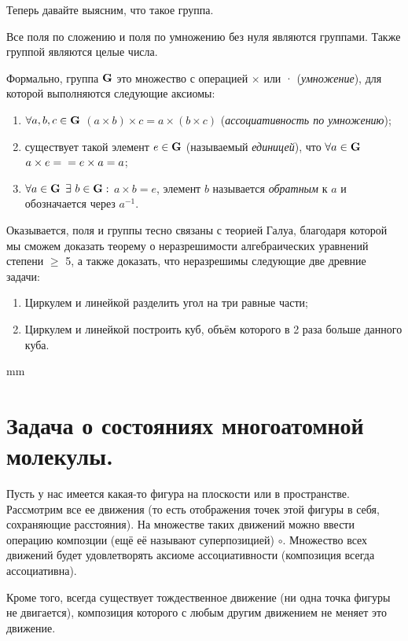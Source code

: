 \documentclass[12pt,english,russian]{article}
\begin{document}
	Теперь давайте выясним, что такое группа.

	Все поля по сложению и поля по умножению без нуля являются группами. Также группой являются целые числа.

	Формально, группа ${\bf G}$ это множество с операцией $\times$ или · (\textit{умножение}), 
	для которой выполняются следующие аксиомы:

	\begin{enumerate}
		\item $\forall a,b,c \in {\bf G}$ $(a\times b)\times c = a\times(b\times c)$ (\textit{ассоциативность по умножению});
		\item существует такой элемент $e \in {\bf G}$ (называемый \textit{единицей}), что $\forall a \in {\bf G}$ $a \times e = \\ = e \times a = a$;
		\item $\forall a \in {\bf G}$ $\exists \ b \in {\bf G}:$ $a \times b = e$, элемент $b$  называется \textit{обратным} к $a$ и обозначается через $a^{-1}$.
	\end{enumerate}

	Оказывается, поля и группы тесно связаны с теорией Галуа,
	благодаря которой мы сможем доказать теорему о неразрешимости 
	алгебраических уравнений степени $\geqslant$ 5, а также доказать,
	что неразрешимы следующие две древние задачи:

	\begin{enumerate}
		\item Циркулем и линейкой разделить угол на три равные части;
		\item Циркулем и линейкой построить куб, объём которого в 2 раза больше данного куба.
	\end{enumerate}
	 mm


	\section{\bf Задача о состояниях многоатомной молекулы.}

	Пусть у нас имеется какая-то фигура на плоскости или в пространстве. 
	Рассмотрим все ее движения (то есть отображения
	точек этой фигуры в себя, сохраняющие расстояния). На множестве 
	таких движений можно ввести операцию композции (ещё
	её называют суперпозицией) $\circ$. Множество всех движений будет
	удовлетворять аксиоме ассоциативности (композиция всегда ассоциативна).

	Кроме того, всегда существует тождественное движение (ни
	одна точка фигуры не двигается), композиция которого с любым
	другим движением не меняет это движение.
\end{document}
